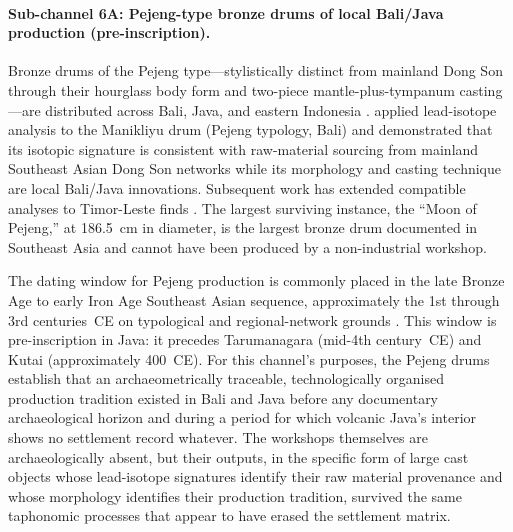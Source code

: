 \documentclass[12pt,a4paper]{article}
\begin{document}
\paragraph{Sub-channel 6A: Pejeng-type bronze drums of local Bali/Java production (pre-inscription).} Bronze drums of the Pejeng type---stylistically distinct from mainland Dong Son through their hourglass body form and two-piece mantle-plus-tympanum casting---are distributed across Bali, Java, and eastern Indonesia \citep{bernetkempers1988}. \citet{calo2014} applied lead-isotope analysis to the Manikliyu drum (Pejeng typology, Bali) and demonstrated that its isotopic signature is consistent with raw-material sourcing from mainland Southeast Asian Dong Son networks while its morphology and casting technique are local Bali/Java innovations. Subsequent work has extended compatible analyses to Timor-Leste finds \citep{calo2019}. The largest surviving instance, the ``Moon of Pejeng,'' at 186.5~cm in diameter, is the largest bronze drum documented in Southeast Asia and cannot have been produced by a non-industrial workshop.

The dating window for Pejeng production is commonly placed in the late Bronze Age to early Iron Age Southeast Asian sequence, approximately the 1st through 3rd centuries~CE on typological and regional-network grounds \citep{bernetkempers1988,calo2014}. This window is pre-inscription in Java: it precedes Tarumanagara (mid-4th century~CE) and Kutai (approximately 400~CE). For this channel's purposes, the Pejeng drums establish that an archaeometrically traceable, technologically organised production tradition existed in Bali and Java before any documentary archaeological horizon and during a period for which volcanic Java's interior shows no settlement record whatever. The workshops themselves are archaeologically absent, but their outputs, in the specific form of large cast objects whose lead-isotope signatures identify their raw material provenance and whose morphology identifies their production tradition, survived the same taphonomic processes that appear to have erased the settlement matrix.
\end{document}
